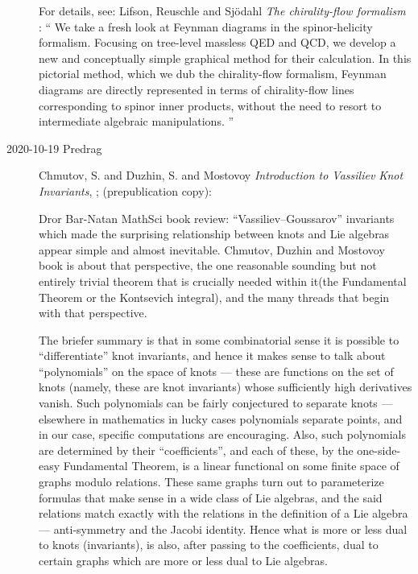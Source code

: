 \begin{description}
For details, see:
Lifson, Reuschle and Sj{\"o}dahl
{\em The chirality-flow formalism} : ``
We take a fresh look at Feynman diagrams in the spinor-helicity
formalism. Focusing on tree-level massless QED and QCD, we develop a new
and conceptually simple graphical method for their calculation. In this
pictorial method, which we dub the chirality-flow formalism, Feynman
diagrams are directly represented in terms of chirality-flow lines
corresponding to spinor inner products, without the need to resort to
intermediate algebraic manipulations. ''

\item[2020-10-19 Predrag]
Chmutov, S. and Duzhin, S. and Mostovoy
{\em Introduction to Vassiliev Knot Invariants},
;
{(prepublication copy)}:

Dror Bar-Natan
{MathSci book review}:
``Vassiliev–Goussarov'' invariants %
which made the surprising relationship between knots and Lie algebras
appear simple and almost inevitable. Chmutov, Duzhin and
Mostovoy book is about that perspective, the one reasonable
sounding but not entirely trivial theorem that is crucially needed within
it(the Fundamental Theorem or the Kontsevich integral), and the many
threads that begin with that perspective.

The briefer summary is that in some combinatorial sense it is possible to
``differentiate'' knot invariants, and hence it makes sense to talk about
``polynomials'' on the space of knots — these are functions on the set of
knots (namely, these are knot invariants) whose sufficiently high
derivatives vanish. Such polynomials can be fairly conjectured to separate
knots — elsewhere in mathematics in lucky cases polynomials separate
points, and in our case, specific computations are encouraging.  Also,
such polynomials are determined by their ``coefficients'', and each
of these, by the one-side-easy Fundamental Theorem, is a linear functional
on some finite space of graphs modulo relations. These same graphs turn
out to parameterize formulas that make sense in a wide class of Lie
algebras, and the said relations match exactly with the relations in the
definition of a Lie algebra — anti-symmetry and the Jacobi identity. Hence
what is more or less dual to knots (invariants), is also, after passing to
the coefficients, dual to certain graphs which are more or less dual to
Lie algebras.


\end{description}

